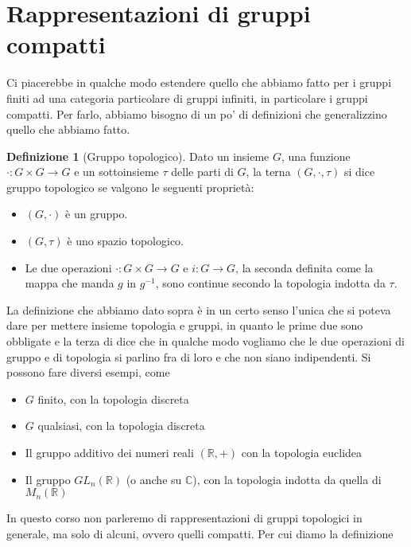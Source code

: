 \documentclass[11pt]{article}
\theoremstyle{plain}
\theoremstyle{definition}
\newtheorem{defn}{Definizione}[section]
\theoremstyle{remark}
\newcommand{\C}{\mathbb{C}}
\newcommand{\R}{\mathbb{R}}
\begin{document}
\newpage
\section{Rappresentazioni di gruppi compatti}

Ci piacerebbe in qualche modo estendere quello che abbiamo fatto per i gruppi finiti ad una categoria particolare di gruppi infiniti, in particolare i gruppi compatti. Per farlo, abbiamo bisogno di un po' di definizioni che generalizzino quello che abbiamo fatto.


\begin{defn}[Gruppo topologico] Dato un insieme $G$, una funzione $\cdot: G\times G \to G$ e un sottoinsieme $\tau$ delle parti di $G$, la terna $(G, \cdot, \tau)$ si dice gruppo topologico se valgono le seguenti proprietà:

\begin{itemize}
\item $(G, \cdot)$ è un gruppo.
\item $(G, \tau)$ è uno spazio topologico.
\item Le due operazioni $\cdot : G \times G \to G$ e $i: G \to G$, la seconda definita come la mappa che manda $g $ in $g^{-1}$,  sono continue secondo la topologia indotta da $\tau$.
\end{itemize}

\end{defn}


La definizione che abbiamo dato sopra è in un certo senso l'unica che si poteva dare per mettere insieme topologia e gruppi, in quanto le prime due sono obbligate e la terza di dice che in qualche modo vogliamo che le due operazioni di gruppo e di topologia si parlino fra di loro e che non siano indipendenti. Si possono fare diversi esempi, come


\begin{itemize}
\item $G$ finito, con la topologia discreta
\item $G$ qualsiasi, con la topologia discreta
\item Il gruppo additivo dei numeri reali $(\R, +)$ con la topologia euclidea
\item Il gruppo $GL_n (\R)$ (o anche su $\C$), con la topologia indotta da quella di $M_n(\R)$

\end{itemize}


In questo corso non parleremo di rappresentazioni di gruppi topologici in generale, ma solo di alcuni, ovvero quelli compatti. Per cui diamo la definizione
\end{document}
